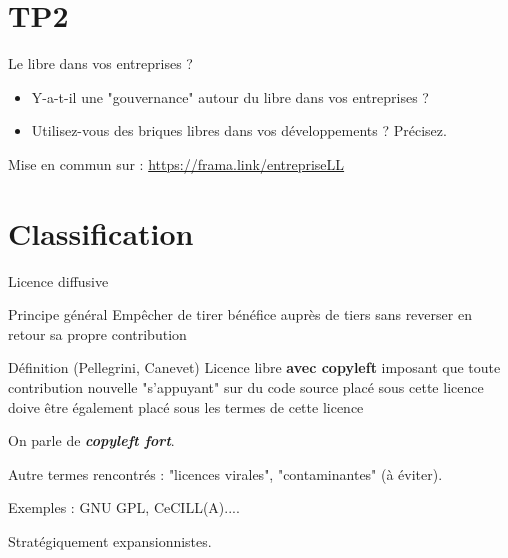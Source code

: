 \documentclass{beamer}
\begin{document}
\section{TP2}

\begin{frame}{Le libre dans vos entreprises ?}

  \begin{itemize}
  \item Y-a-t-il une "gouvernance" autour du libre dans vos
    entreprises ?
  \item Utilisez-vous des briques libres dans vos développements ? Précisez.
  \end{itemize}
Mise en commun sur :
\url{https://frama.link/entrepriseLL}
  
\end{frame}


\section{Classification}


\begin{frame}{Licence diffusive}

  \begin{block}{Principe général}
    Empêcher de tirer bénéfice auprès de tiers sans reverser en retour sa propre contribution    
  \end{block}

  \begin{alertblock}{Définition (Pellegrini, Canevet)}
    Licence libre \textbf{avec copyleft} imposant que toute contribution nouvelle "s'appuyant" sur du code source placé sous cette licence doive être également placé sous les termes de cette licence
   \end{alertblock}

On parle de \textit{\textbf{copyleft fort}}.

Autre termes rencontrés : "licences virales", "contaminantes" (à éviter).
  
Exemples : GNU GPL, CeCILL(A)....

Stratégiquement expansionnistes.
\end{frame}

\end{document}

